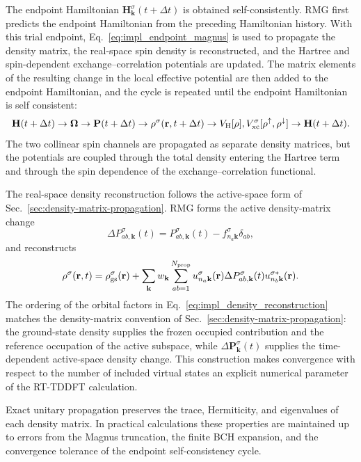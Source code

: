 The endpoint Hamiltonian
$\mathbf H_{\mathbf k}^{\sigma}(t+\Delta t)$ is obtained
self-consistently.  RMG first predicts the endpoint Hamiltonian from
the preceding Hamiltonian history.  With this trial endpoint,
Eq.~\eqref{eq:impl_endpoint_magnus} is used to propagate the density
matrix, the real-space spin density is reconstructed, and the Hartree
and spin-dependent exchange--correlation potentials are updated.  The
matrix elements of the resulting change in the local effective
potential are then added to the endpoint Hamiltonian, and the cycle is
repeated until the endpoint Hamiltonian is self consistent:
\[
  \mathbf H(t+\Delta t)
  \rightarrow
  \boldsymbol{\Omega}
  \rightarrow
  \mathbf P(t+\Delta t)
  \rightarrow
  \rho^\sigma(\mathbf r,t+\Delta t)
  \rightarrow
  V_{\rm H}[\rho],
  V_{\rm xc}^{\sigma}[\rho^\uparrow,\rho^\downarrow]
  \rightarrow
  \mathbf H(t+\Delta t).
\]
The two collinear spin channels are propagated as separate density
matrices, but the potentials are coupled through the total density
entering the Hartree term and through the spin dependence of the
exchange--correlation functional.

The real-space density reconstruction follows the active-space form of
Sec.~\ref{sec:density-matrix-propagation}.  RMG forms the active
density-matrix change
\begin{equation}
  \Delta P_{ab,\mathbf k}^{\sigma}(t)
  =
  P_{ab,\mathbf k}^{\sigma}(t)
  -
  f_{n_a\mathbf k}^{\sigma}\delta_{ab},
  \label{eq:impl_delta_p_active}
\end{equation}
and reconstructs
\begin{equation}
  \rho^\sigma(\mathbf r,t)
  =
  \rho_{\rm gs}^{\sigma}(\mathbf r)
  +
  \sum_{\mathbf k}
  w_{\mathbf k}
  \sum_{ab=1}^{N_{\rm prop}}
  u_{n_a\mathbf k}^{\sigma}(\mathbf r)
  \Delta P_{ab,\mathbf k}^{\sigma}(t)
  u_{n_b\mathbf k}^{\sigma *}(\mathbf r).
  \label{eq:impl_density_reconstruction}
\end{equation}
The ordering of the orbital factors in
Eq.~\eqref{eq:impl_density_reconstruction} matches the density-matrix
convention of Sec.~\ref{sec:density-matrix-propagation}: the
ground-state density supplies the frozen occupied contribution and the
reference occupation of the active subspace, while
$\Delta\mathbf P_{\mathbf k}^{\sigma}(t)$ supplies the time-dependent
active-space density change.  This construction makes convergence with
respect to the number of included virtual states an explicit numerical
parameter of the RT-TDDFT calculation.

Exact unitary propagation preserves the trace, Hermiticity, and
eigenvalues of each density matrix.  In practical calculations these
properties are maintained up to errors from the Magnus truncation, the
finite BCH expansion, and the convergence tolerance of the endpoint
self-consistency cycle.

